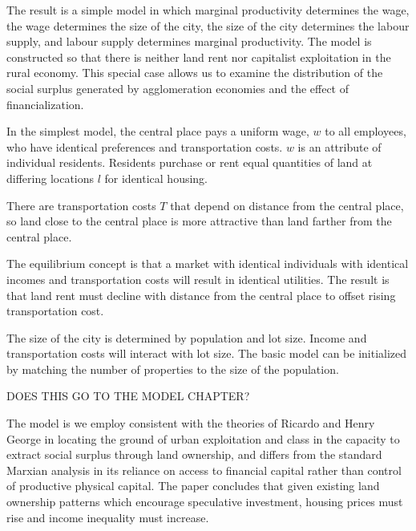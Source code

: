 The result is a simple model in which marginal productivity determines the wage, the wage determines the size of the city, the size of the city determines the labour supply, and labour supply determines marginal productivity. 
The model is constructed so that there is neither land rent nor capitalist exploitation in the rural economy. 
This special case allows us to examine the distribution of the social surplus generated by agglomeration economies and the effect of financialization.

In the simplest model, the central place pays a uniform wage, $w$ to all employees, who have identical preferences and transportation costs. $w$ is an attribute of individual residents. Residents  purchase or rent equal quantities of land at differing locations $l$ for identical housing.  

There are transportation costs $T$ that depend on distance from the  central place, so land close to the central place is more attractive than land farther from the central place.  

The equilibrium concept is that a market with identical individuals with identical incomes and transportation costs will result in identical utilities. The result is that land rent must decline with distance from the central place to offset rising transportation cost. 

The size of the city is determined by population and lot size. Income and transportation costs will interact with lot size. The basic model can be initialized by matching the number of properties to the size of the population. 

DOES THIS GO TO THE MODEL CHAPTER?

The model is we employ consistent with the theories of Ricardo and Henry George in locating the ground of urban exploitation and class in the capacity to extract social surplus through land ownership, and differs from the standard Marxian analysis in its reliance on access to financial capital rather than control of productive physical capital. The paper concludes that given existing land ownership patterns which encourage speculative investment, housing prices must rise and income inequality must increase. 

